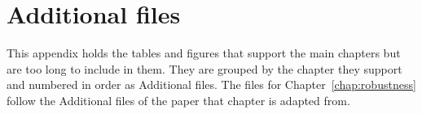 \chapter{Additional files}\label{app:additional}\label{app:noiseinject}\label{app:results}
\providecommand{\theHaddfile}{addfile.\arabic{addfile}}
\newcommand{\addfile}[1]{\refstepcounter{addfile}\par\medskip\noindent\textbf{Additional file~\theaddfile: #1}\par\nopagebreak\smallskip}

This appendix holds the tables and figures that support the main chapters but are too long to include in them. They are grouped by the chapter they support and numbered in order as Additional files. The files for Chapter~\ref{chap:robustness} follow the Additional files of the paper that chapter is adapted from.

